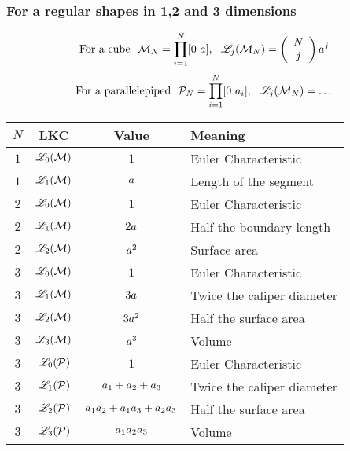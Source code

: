\documentclass[a4paper,12pt]{article}
\begin{document}
\subsubsection{For a regular shapes in 1,2 and 3 dimensions}
\begin{equation}
  \text{For a cube} \ \ \MRF_N=\prod_{i=1}^{N}[0\ \Msize], \ \ \LKC_j(\MRF_N)= \left( \begin{array}{c} N \\ j \end{array} \right) \Msize^j
\end{equation}
\begin{equation}
  \text{For a parallelepiped} \ \ \PRF_N=\prod_{i=1}^{N}[0\ \Msize_i], \ \ \LKC_j(\MRF_N)= \dots
\end{equation}
\begin{center}
  \begin{tabular}{c|c|c|l}
    $N$ & LKC & Value & Meaning \\
    \hline
    $1$ & $\mathscr{L}_0(\mathcal{M})$ & $1$ & Euler Characteristic \\
    $1$ & $\mathscr{L}_1(\mathcal{M})$ & $a$ & Length of the segment \\
    \hline
    $2$ & $\mathscr{L}_0(\mathcal{M})$ & $1$ & Euler Characteristic \\
    $2$ & $\mathscr{L}_1(\mathcal{M})$ & $2a$ & Half the boundary length \\
    $2$ & $\mathscr{L}_2(\mathcal{M})$ & $a^2$ & Surface area \\
    \hline
    $3$ & $\mathscr{L}_0(\mathcal{M})$ & $1$ & Euler Characteristic \\
    $3$ & $\mathscr{L}_1(\mathcal{M})$ & $3a$ & Twice the caliper diameter \\
    $3$ & $\mathscr{L}_2(\mathcal{M})$ & $3a^2$ & Half the surface area \\
    $3$ & $\mathscr{L}_3(\mathcal{M})$ & $a^3$ & Volume \\
    \hline
    $3$ & $\mathscr{L}_0(\mathcal{P})$ & $1$ & Euler Characteristic \\
    $3$ & $\mathscr{L}_1(\mathcal{P})$ & $a_1+a_2+a_3$ & Twice the caliper diameter \\
    $3$ & $\mathscr{L}_2(\mathcal{P})$ & $a_1a_2+a_1a_3+a_2a_3$ & Half the surface area \\
    $3$ & $\mathscr{L}_3(\mathcal{P})$ & $a_1a_2a_3$ & Volume \\
  \end{tabular}
\end{center}
\end{document}
